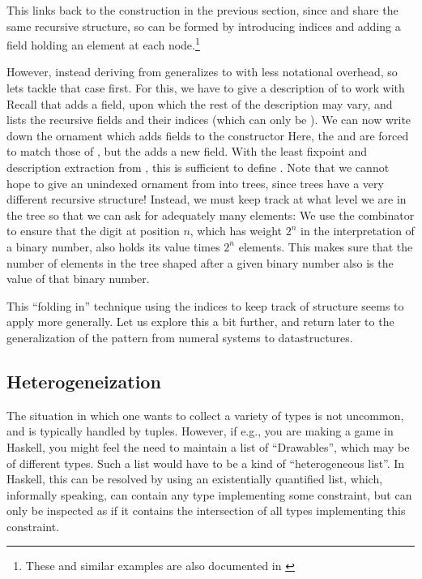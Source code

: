 This links back to the construction in the previous section, since \bN{} and  share the same recursive structure, so  can be formed by introducing indices and adding a field holding an element at each node.\footnote{These and similar examples are also documented in \cite{progorn}} 

However, instead deriving  from \bN{} generalizes to \bL{} with less notational overhead, so lets tackle that case first. For this, we have to give a description of \bN{} to work with
Recall that  adds a field, upon which the rest of the description may vary, and  lists the recursive fields and their indices (which can only be ).
We can now write down the ornament which adds fields to the  constructor
Here, the  and  are forced to match those of ,
but the  adds a new field. With the least fixpoint and description extraction from \cite{progorn}, this is sufficient to define . Note that we cannot hope to give an unindexed ornament from \bL{}
into trees, since trees have a very different recursive structure! Instead, we must keep track at what level we are in the tree so that we can ask for adequately many elements:
We use the  combinator to ensure that the digit at position $n$, which has weight $2^n$ in the interpretation of a binary number, also holds its value times $2^n$ elements. This makes sure that the number of elements in the tree shaped after a given binary number also is the value of that  binary number.

This ``folding in'' technique using the indices to keep track of structure seems to apply more generally. Let us explore this a bit further, and return later to the generalization of the pattern from numeral systems to datastructures.

\subsection{Heterogeneization}
The situation in which one wants to collect a variety of types is not uncommon, and is typically handled by tuples. However, if e.g., you are making a game in Haskell, you might feel the need to maintain a list of ``Drawables'', which may be of different types. Such a list would have to be a kind of ``heterogeneous list''. In Haskell, this can be resolved by using an existentially quantified list, which, informally speaking, can contain any type implementing some constraint, but can only be inspected as if it contains the intersection of all types implementing this constraint. 

